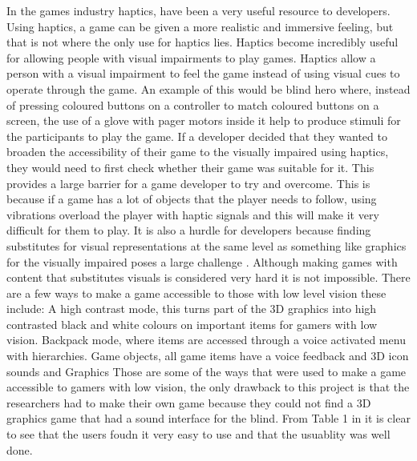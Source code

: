 \documentclass[11pt]{scrartcl}
\begin{document}
In the games industry haptics, have been a very useful resource to developers. Using haptics, a game can be given a more realistic and immersive feeling\cite{orozco2012role}, but that is not where the only use for haptics lies. 
Haptics become incredibly useful for allowing people with visual impairments to play games. Haptics allow a person with a visual impairment to feel the game instead of using visual cues to operate through the game. 
An example of this would be blind hero where, instead of pressing coloured buttons on a controller to match coloured buttons on a screen, the use of a glove with pager motors inside it help to produce stimuli for the participants to play the game.\cite{yuan2008blind}
If a developer decided that they wanted to broaden the accessibility of their game to the visually impaired using haptics, they would need to first check whether their game was suitable for it. This provides a large barrier for a game developer to try and overcome. This is because if a game has a lot of objects that the player needs to follow, using vibrations overload the player with haptic signals and this will make it very difficult for them to play\cite{orozco2012role}. 
It is also a hurdle for developers because finding substitutes for visual representations at the same level as something like graphics for the visually impaired poses a large challenge \cite{yuan2009towards}.
Although making games with content that substitutes visuals is considered very hard it is not impossible. There are a few ways to make a game accessible to those with low level vision these include:
A high contrast mode, this turns part of the 3D graphics into high contrasted black and white colours on important items for gamers with low vision.
Backpack mode, where items are accessed through a voice activated menu with hierarchies.
Game objects, all game items have a voice feedback and 3D icon sounds and Graphics \cite{westin2004game}
Those are some of the ways that were used to make a game accessible to gamers with low vision, the only drawback to this project is that the researchers had to make their own game because they could not find a 3D graphics game that had a sound interface for the blind. From Table 1 in \cite{westin2004game} it is clear to see that the users foudn it very easy to use and that the usuablity was well done.


\section{}



\section{}





\end{document}
